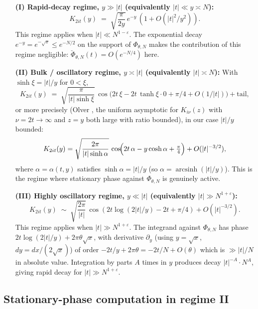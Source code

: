 \documentclass[11pt]{article}
\theoremstyle{definition}
\newcommand{\ash}{\operatorname{arcsinh}}
\begin{document}
\begin{itemize}
\item[\textbf{(I) Rapid-decay regime, $y \gg |t|$ (equivalently $|t| \ll y \asymp N$):}]
\[
   K_{2it}(y) \;=\; \sqrt{\frac{\pi}{2y}}\,e^{-y}\,(1 + O(|t|^2/y^2)).
\]
This regime applies when $|t| \ll N^{1-\varepsilon}$. The exponential decay $e^{-y} = e^{-\sqrt x} \le e^{-N/2}$ on the support of $\Phi_{\theta,N}$ makes the contribution of this regime negligible: $\check\Phi_{\theta,N}(t) = O(e^{-N/4})$ here.

\item[\textbf{(II) Bulk / oscillatory regime, $y \asymp |t|$ (equivalently $|t| \asymp N$):}]
With $\sinh\xi = |t|/y$ for $0 < \xi$,
\[
   K_{2it}(y) \;=\; \sqrt{\frac{\pi}{|t|\sinh\xi}}\, \cos\!\bigl(2t\,\xi - 2t\,\tanh\xi\cdot 0 + \pi/4 + O(1/|t|)\bigr) + \text{tail},
\]
or more precisely (Olver \cite[Ch.~10, \S 7.3]{olver}, the uniform asymptotic for $K_{i\nu}(z)$ with $\nu = 2t \to \infty$ and $z = y$ both large with ratio bounded), in our case $|t|/y$ bounded:
\begin{equation}\label{eq:K-asymp-bulk}
   K_{2it}(y) = \sqrt{\frac{2\pi}{|t|\sinh \alpha}}\, \cos\!\Bigl(2t\,\alpha - y\cosh\alpha + \tfrac{\pi}{4}\Bigr) + O(|t|^{-3/2}),
\end{equation}
where $\alpha = \alpha(t,y)$ satisfies $\sinh\alpha = |t|/y$ (so $\alpha = \ash(|t|/y)$). This is the regime where stationary phase against $\Phi_{\theta,N}$ is genuinely active.

\item[\textbf{(III) Highly oscillatory regime, $y \ll |t|$ (equivalently $|t| \gg N^{1+\varepsilon}$):}]
\[
   K_{2it}(y) \;\sim\; \sqrt{\frac{2\pi}{|t|}}\,\cos(2t\log(2|t|/y) - 2t + \pi/4) + O(|t|^{-3/2}).
\]
This regime applies when $|t| \gg N^{1+\varepsilon}$. The integrand against $\Phi_{\theta,N}$ has phase $2t\log(2|t|/y) + 2\pi\theta\sqrt x$, with derivative $\partial_y$ (using $y = \sqrt x$, $dy = dx/(2\sqrt x)$) of order $-2t/y + 2\pi\theta = -2t/N + O(\theta)$ which is $\gg |t|/N$ in absolute value. Integration by parts $A$ times in $y$ produces decay $|t|^{-A}\cdot N^A$, giving rapid decay for $|t| \gg N^{1+\varepsilon}$.
\end{itemize}

\subsection{Stationary-phase computation in regime II}\label{ssec:stat-phase-II}
\end{document}
